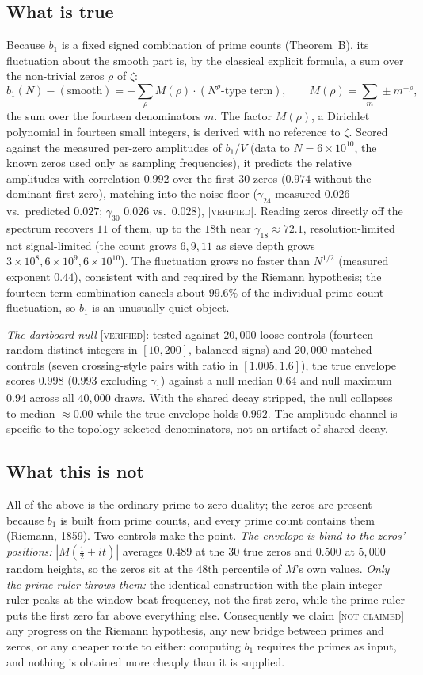 \documentclass[11pt,reqno]{amsart}
\theoremstyle{plain}
\theoremstyle{definition}
\theoremstyle{plain}
\newcommand{\st}{\textsc}
\begin{document}
\subsection{What is true}
Because $b_1$ is a fixed signed combination of prime counts (Theorem~B), its fluctuation about
the smooth part is, by the classical explicit formula, a sum over the non-trivial zeros $\rho$
of $\zeta$:
\[
b_1(N)-(\text{smooth})=-\sum_\rho M(\rho)\cdot(N^\rho\text{-type term}),\qquad
M(\rho)=\sum_{m}\pm m^{-\rho},
\]
the sum over the fourteen denominators $m$. The factor $M(\rho)$, a Dirichlet polynomial in
fourteen small integers, is derived with no reference to $\zeta$. Scored against the measured
per-zero amplitudes of $b_1/V$ (data to $N=6\times10^{10}$, the known zeros used only as
sampling frequencies), it predicts the relative amplitudes with correlation $0.992$ over the
first $30$ zeros ($0.974$ without the dominant first zero), matching into the noise floor
($\gamma_{24}$ measured $0.026$ vs.\ predicted $0.027$; $\gamma_{30}$ $0.026$ vs.\ $0.028$),
\st{[verified]}. Reading zeros directly off the spectrum recovers $11$ of them, up to the
$18$th near $\gamma_{18}\approx72.1$, resolution-limited not signal-limited (the count grows
$6,9,11$ as sieve depth grows $3\times10^8,6\times10^9,6\times10^{10}$). The fluctuation grows
no faster than $N^{1/2}$ (measured exponent $0.44$), consistent with and required by the
Riemann hypothesis; the fourteen-term combination cancels about $99.6\%$ of the individual
prime-count fluctuation, so $b_1$ is an unusually quiet object.

\emph{The dartboard null} \st{[verified]}: tested against $20{,}000$ loose controls (fourteen
random distinct integers in $[10,200]$, balanced signs) and $20{,}000$ matched controls (seven
crossing-style pairs with ratio in $[1.005,1.6]$), the true envelope scores $0.998$ ($0.993$
excluding $\gamma_1$) against a null median $0.64$ and null maximum $0.94$ across all $40{,}000$
draws. With the shared decay stripped, the null collapses to median $\approx0.00$ while the true
envelope holds $0.992$. The amplitude channel is specific to the topology-selected denominators,
not an artifact of shared decay.

\subsection{What this is not}
All of the above is the ordinary prime-to-zero duality; the zeros are present because $b_1$ is
built from prime counts, and every prime count contains them (Riemann, 1859). Two controls make
the point. \emph{The envelope is blind to the zeros' positions:} $|M(\tfrac12+it)|$ averages
$0.489$ at the $30$ true zeros and $0.500$ at $5{,}000$ random heights, so the zeros sit at the
$48$th percentile of $M$'s own values. \emph{Only the prime ruler throws them:} the identical
construction with the plain-integer ruler peaks at the window-beat frequency, not the first
zero, while the prime ruler puts the first zero far above everything else. Consequently we claim
\st{[not claimed]} any progress on the Riemann hypothesis, any new bridge between primes and
zeros, or any cheaper route to either: computing $b_1$ requires the primes as input, and
nothing is obtained more cheaply than it is supplied.
\end{document}
